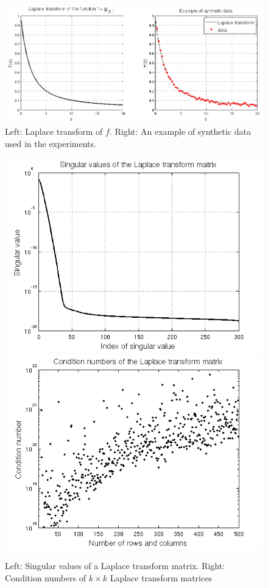 \documentclass[12pt,a4]{article}
\begin{document}
\begin{figure}[t]
\begin{center}
\includegraphics[scale=.5]{img/laplace_data.png}
\end{center}
\caption{Left: Laplace transform of $f$. Right: An example of synthetic data used in the experiments.}
\label{fig:laplace}
\end{figure}

\begin{figure}[t]
\begin{center}
\includegraphics[scale=.4]{img/singular.png}
\includegraphics[scale=.4]{img/cond.png}
\end{center}
\caption{Left: Singular values of a Laplace transform matrix. Right: Condition numbers of $k \times k$ Laplace transform matrices}
\label{fig:singular}
\end{figure}
\end{document}
